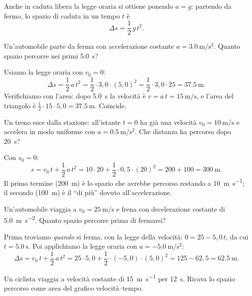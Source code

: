 Anche in caduta libera la legge oraria si ottiene ponendo $a = g$: partendo da fermo, lo spazio di caduta in un tempo $t$ è
\[ \Delta s = \frac{1}{2}\,g\,t^2. \]

\begin{testexample}
Un'automobile parte da ferma con accelerazione costante $a = \SI{3,0}{\metre\per\second\squared}$. Quanto spazio percorre nei primi \SI{5,0}{\second}?

Usiamo la legge oraria con $v_0 = 0$:
\[ \Delta s = \frac{1}{2}\,a\,t^2 = \frac{1}{2}\cdot 3{,}0 \cdot (5{,}0)^2 = \frac{1}{2}\cdot 3{,}0 \cdot 25 = \SI{37,5}{\metre}. \]
Verifichiamo con l'area: dopo \SI{5,0}{\second} la velocità è $v = a\,t = \SI{15}{\metre\per\second}$, e l'area del triangolo è $\tfrac{1}{2}\cdot 15 \cdot 5{,}0 = \SI{37,5}{\metre}$. Coincide.
\end{testexample}

\begin{testexample}
Un treno esce dalla stazione: all'istante $t = 0$ ha già una velocità $v_0 = \SI{10}{\metre\per\second}$ e accelera in modo uniforme con $a = \SI{0,5}{\metre\per\second\squared}$. Che distanza ha percorso dopo \SI{20}{\second}?

Con $s_0 = 0$:
\[ s = v_0\,t + \frac{1}{2}\,a\,t^2 = 10 \cdot 20 + \frac{1}{2}\cdot 0{,}5 \cdot (20)^2 = 200 + 100 = \SI{300}{\metre}. \]
Il primo termine (\SI{200}{\metre}) è lo spazio che avrebbe percorso restando a \SI{10}{\metre\per\second}; il secondo (\SI{100}{\metre}) è il ``di più'' dovuto all'accelerazione.
\end{testexample}

\begin{testexample}
Un'automobile viaggia a $v_0 = \SI{25}{\metre\per\second}$ e frena con decelerazione costante di \SI{5,0}{\metre\per\second\squared}. Quanto spazio percorre prima di fermarsi?

Prima troviamo \emph{quando} si ferma, con la legge della velocità: $0 = 25 - 5{,}0\,t$, da cui $t = \SI{5,0}{\second}$. Poi applichiamo la legge oraria con $a = \SI{-5,0}{\metre\per\second\squared}$:
\[ \Delta s = v_0\,t + \frac{1}{2}\,a\,t^2 = 25 \cdot 5{,}0 + \frac{1}{2}\cdot(-5{,}0)\cdot(5{,}0)^2 = 125 - 62{,}5 = \SI{62,5}{\metre}. \]
\end{testexample}

\begin{esercizio}
Un ciclista viaggia a velocità costante di \SI{15}{\metre\per\second} per \SI{12}{\second}. Ricava lo spazio percorso come area del grafico velocità--tempo.\\
\end{esercizio}

